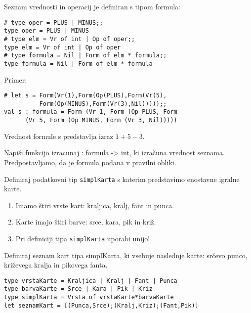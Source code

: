 \begin{ex}
Seznam vrednosti in operacij je definiran s tipom formula: 

\begin{lstlisting}
# type oper = PLUS | MINUS;; 
type oper = PLUS | MINUS 
# type elm = Vr of int | Op of oper;; 
type elm = Vr of int | Op of oper 
# type formula = Nil | Form of elm * formula;; 
type formula = Nil | Form of elm * formula 
\end{lstlisting}

Primer: 
\begin{lstlisting}
# let s = Form(Vr(1),Form(Op(PLUS),Form(Vr(5),
          Form(Op(MINUS),Form(Vr(3),Nil)))));;
val s : formula = Form (Vr 1, Form (Op PLUS, Form 
      (Vr 5, Form (Op MINUS, Form (Vr 3, Nil))))) 
\end{lstlisting}
Vrednost formule s predstavlja izraz $1+5-3$. 

Napi\v si funkcijo izracunaj : formula -> int, ki izra\v cuna vrednost seznama. Predpostavljamo, da je formula podana v pravilni obliki.



\end{ex}
\begin{ex}
Definiraj podatkovni tip \lstinline{simplKarta} s katerim predstavimo enostavne igralne karte. 
\begin{enumerate}
\item Imamo \v stiri vrste kart: kraljica, kralj, fant in punca. 
\item Karte imajo \v stiri barve: srce, kara, pik in kri\v z. 
\item Pri definiciji tipa \lstinline{simplKarta} uporabi unijo!
\end{enumerate}

Definiraj seznam kart tipa simplKarta, ki vsebuje naslednje karte: sr\v cevo punco, kri\v zevega kralja in pikovega fanta. 

\begin{sol}
\begin{lstlisting}
type vrstaKarte = Kraljica | Kralj | Fant | Punca
type barvaKarte = Srce | Kara | Pik | Kriz
type simplKarta = Vrsta of vrstaKarte*barvaKarte
let seznamKart = [(Punca,Srce);(Kralj,Kriz);(Fant,Pik)]
\end{lstlisting}
\end{sol}


\end{ex}
